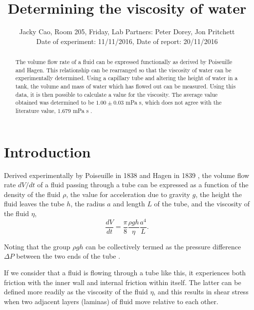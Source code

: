 \documentclass[twocolumn]{revtex4}
\newcommand{\squeezeup}{\vspace{-2.5mm}}
\begin{document}
\textheight=26.385cm

\title{Determining the viscosity of water} 
 
 
\author{Jacky Cao, Room 205, Friday, Lab Partners: Peter Dorey, Jon Pritchett \\ Date of experiment: 11/11/2016, Date of report: 20/11/2016}


\begin{abstract}              
The volume flow rate of a fluid can be expressed functionally as derived by Poiseuille and Hagen. This relationship can be rearranged so that the viscosity of water can be experimentally determined. Using a capillary tube and altering the height of water in a tank, the volume and mass of water which has flowed out can be measured. Using this data, it is then possible to calculate a value for the viscosity. The average value obtained was determined to be $1.00 \pm 0.03$ mPa s, which does not agree with the literature value, $1.679$ mPa s \cite{crc}. 
\squeezeup
\squeezeup
\squeezeup
\end{abstract}

\maketitle

\squeezeup
\squeezeup

\section{Introduction} 
\vspace{-2ex} 
Derived experimentally by Poiseuille in 1838 and Hagen in 1839 \cite{poiseuillehagen}, the volume flow rate $dV/dt$ of a fluid passing through a tube can be expressed as a function of the density of the fluid $\rho$, the value for acceleration due to gravity $g$, the height the fluid leaves the tube $h$, the radius $a$ and length $L$ of the tube, and the viscosity of the fluid $\eta$,
\squeezeup
\begin{equation} 
\frac{dV}{dt}=\frac{\pi}{8}\frac{\rho gh}{\eta}\frac{a^4}{L}. 
\label{pohagen}
\end{equation}

Noting that the group $\rho gh$ can be collectively termed as the pressure difference $\Delta P$ between the two ends of the tube \cite{collegephysics}. 

If we consider that a fluid is flowing through a tube like this, it experiences both friction with the inner wall and internal friction within itself. The latter can be defined more readily as the viscosity of the fluid $\eta$, and this results in shear stress when two adjacent layers (laminas) of fluid move relative to each other. 
\end{document}
